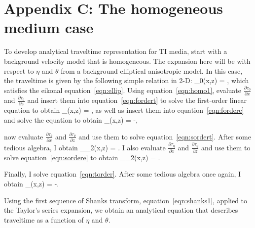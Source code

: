\appendix
\section{Appendix C: The homogeneous medium case}

To develop analytical traveltime representation for TI media,   start with a background velocity model that is homogeneous. 
The expansion here will be with respect to $\eta$ and $\theta$ from a background elliptical anisotropic model.
In this case, the traveltime  is given by the following simple relation in 2-D:
\beq
\tau_{0}(x,z) = ,
\label{eqn:homo1}
\eeq
which satisfies the eikonal equation~\ref{eqn:ellip}. Using equation~\ref{eqn:homo1},   evaluate $\frac{\partial \tau _{0}}{\partial x}$ and
$\frac{\partial \tau _{0}}{\partial z}$ and insert them into equation~\ref{eqn:fordert} to solve the first-order linear equation to obtain 
\beq
\tau_{\theta}(x,z) = ,
\label{eqn:homo2}
\eeq
as well as insert them into equation~\ref{eqn:fordere} and solve the equation to obtain
\beq
\tau_{\eta}(x,z) = -,
\label{eqn:homo22}
\eeq

  now evaluate $\frac{\partial \tau _{\theta}}{\partial x}$ and $\frac{\partial \tau _{\theta}}{\partial z}$ and use them to solve equation~\ref{eqn:sordert}.
After some tedious algebra, I obtain
\beq
\tau_{\theta_2}(x,z) = .
\label{eqn:homo3}
\eeq
I also evaluate $\frac{\partial \tau _{\eta}}{\partial x}$ and $\frac{\partial \tau _{\eta}}{\partial z}$ 
and use them to solve equation~\ref{eqn:sordere} to obtain
\beq
\tau_{\eta_2}(x,z) = .
\label{eqn:homo32}
\eeq

Finally, I solve equation~\ref{eqn:torder}.
After some tedious algebra once again, I obtain
\beq
\tau_{\eta \theta}(x,z) = -.
\label{eqn:homo4}
\eeq

Using the first sequence of Shanks transform, equation~\ref{eqn:shanks1}, applied to the Taylor's series expansion, we obtain an
analytical equation that describes traveltime as a function of $\eta$ and $\theta$. 


